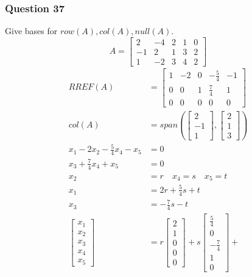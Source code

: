 \documentclass{math}
\begin{document}
\subsubsection*{Question 37}
Give bases for \( row(A), col(A), null(A) \).
\[ A = \begin{bmatrix}
  2 & -4 & 2 & 1 & 0 \\
  -1 & 2 & 1 & 3 & 2 \\
  1 & -2 & 3 & 4 & 2
\end{bmatrix} \]
\begin{align*}
  RREF(A) &= \begin{bmatrix}
    1 & -2 & 0 & -\frac{5}{4} & -1 \\
    0 & 0 & 1 & \frac{7}{4} & 1 \\
    0 & 0 & 0 & 0 & 0
  \end{bmatrix} \\
  col(A) &= span\left(\begin{bmatrix}
    2 \\ -1 \\ 1
  \end{bmatrix},\begin{bmatrix}
    2 \\ 1 \\ 3
  \end{bmatrix}\right) \\
  x_1-2x_2-\frac{5}{4}x_4-x_5 &= 0 \\
  x_3+\frac{7}{4}x_4+x_5 &= 0 \\
  x_2 &= r \quad x_4 = s \quad x_5 = t \\
  x_1 &= 2r+\frac{5}{4}s+t \\
  x_3 &= -\frac{7}{4}s-t \\
  \begin{bmatrix} x_1 \\ x_2 \\ x_3 \\ x_4 \\ x_5\end{bmatrix} &=
    r\begin{bmatrix}2 \\ 1 \\ 0 \\ 0 \\ 0\end{bmatrix}+
    s\begin{bmatrix}\frac{5}{4} \\ 0 \\ -\frac{7}{4} \\ 1 \\ 0\end{bmatrix}+

\end{align*}
\end{document}

